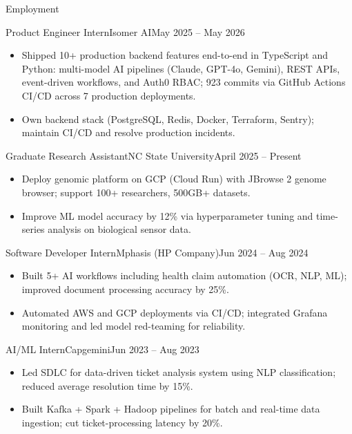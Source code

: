 \documentclass[]{mcdowellcv}
\begin{document}
\makeheader

\begin{cvsection}{Employment}
  \begin{cvsubsection}{Product Engineer Intern}{Isomer AI}{May 2025 -- May 2026}
    \begin{itemize}
      \item Shipped 10+ production backend features end-to-end in TypeScript and Python: multi-model AI pipelines (Claude, GPT-4o, Gemini), REST APIs, event-driven workflows, and Auth0 RBAC; 923 commits via GitHub Actions CI/CD across 7 production deployments.
      \item Own backend stack (PostgreSQL, Redis, Docker, Terraform, Sentry); maintain CI/CD and resolve production incidents.
    \end{itemize}
    \vspace{-1.5pt}
  \end{cvsubsection}

  \begin{cvsubsection}{Graduate Research Assistant}{NC State University}{April 2025 -- Present}
    \begin{itemize}
      \item Deploy genomic platform on GCP (Cloud Run) with JBrowse 2 genome browser; support 100+ researchers, 500GB+ datasets.
      \item Improve ML model accuracy by 12\% via hyperparameter tuning and time-series analysis on biological sensor data.
    \end{itemize}
    \vspace{-1.5pt}
  \end{cvsubsection}

  \begin{cvsubsection}{Software Developer Intern}{Mphasis (HP Company)}{Jun 2024 -- Aug 2024}
    \begin{itemize}
      \item Built 5+ AI workflows including health claim automation (OCR, NLP, ML); improved document processing accuracy by 25\%.
      \item Automated AWS and GCP deployments via CI/CD; integrated Grafana monitoring and led model red-teaming for reliability.
    \end{itemize}
    \vspace{-1.5pt}
  \end{cvsubsection}

  \begin{cvsubsection}{AI/ML Intern}{Capgemini}{Jun 2023 -- Aug 2023}
    \begin{itemize}
      \item Led SDLC for data-driven ticket analysis system using NLP classification; reduced average resolution time by 15\%.
      \item Built Kafka + Spark + Hadoop pipelines for batch and real-time data ingestion; cut ticket-processing latency by 20\%.
    \end{itemize}
    \vspace{-1.5pt}
  \end{cvsubsection}
\end{cvsection}
\end{document}
